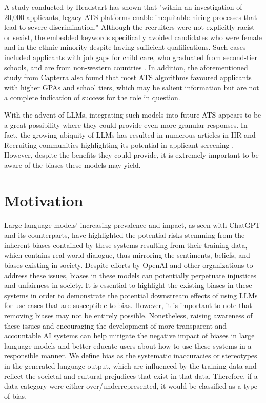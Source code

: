 \documentclass{article}
\begin{document}
A study conducted by Headstart has shown that "within an investigation of 20,000 applicants, legacy ATS platforms enable inequitable hiring processes that lead to severe discrimination." Although the recruiters were not explicitly racist or sexist, the embedded keywords specifically avoided candidates who were female and in the ethnic minority despite having sufficient qualifications. Such cases included applicants with job gaps for child care, who graduated from second-tier schools, and are from non-western countries \cite{Inc.}. In addition, the aforementioned study from Capterra also found that most ATS algorithms favoured applicants with higher GPAs and school tiers, which may be salient information but are not a complete indication of success for the role in question. 

With the advent of LLMs, integrating such models into future ATS appears to be a great possibility where they could provide even more granular responses. In fact, the growing ubiquity of LLMs has resulted in numerous articles in HR and Recruiting communities highlighting its potential in applicant screening \cite{RT,Xref,EmmaE,CIO}. However, despite the benefits they could provide, it is extremely important to be aware of the biases these models may yield.

\section{Motivation}


Large language models' increasing prevalence and impact, as seen with ChatGPT and its counterparts, have highlighted the potential risks stemming from the inherent biases contained by these systems resulting from their training data, which contains real-world dialogue, thus mirroring the sentiments, beliefs, and biases existing in society. Despite efforts by OpenAI and other organizations to address these issues, biases in these models can potentially perpetuate injustices and unfairness in society. It is essential to highlight the existing biases in these systems in order to demonstrate the potential downstream effects of using LLMs for use cases that are susceptible to bias. However, it is important to note that removing biases may not be entirely possible. Nonetheless, raising awareness of these issues and encouraging the development of more transparent and accountable AI systems can help mitigate the negative impact of biases in large language models and better educate users about how to use these systems in a responsible manner. 
We define bias as the systematic inaccuracies or stereotypes in the generated language output, which are influenced by the training data and reflect the societal and cultural prejudices that exist in that data. Therefore, if a data category were either over/underrepresented, it would be classified as a type of bias.\cite{borji2023categorical}
\end{document}
